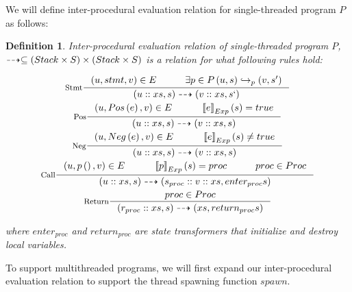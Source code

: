 \documentclass[..thesis.tex]{subfiles}
\newtheorem{defin}{Definition}[section]
\begin{document}
We will define inter-procedural evaluation relation for single-threaded program $P$ as follows:

\begin{defin}

Inter-procedural evaluation relation of single-threaded program $P$, 
$\dashrightarrow \subseteq \left( Stack \times S \right) \times \left( Stack \times S \right)$ 
is a relation for what following rules hold:

\addtolength{\jot}{2em}
\begin{gather*}
  \inference[Stmt]{\lp u, stmt, v \rp \in E  \separ \exists p \in P  \lp u, s \rp \intraproc_p \lp v, s' \rp }{ \lp u :: xs, s \rp \interproc \lp v :: xs, s` \rp} \\
  \inference[Pos]{ \lp u, Pos \lp e \rp, v \rp \in E \separ   \lllb e \rrrb_{Exp} \lp s \rp = true  }{\lp u :: xs , s \rp \interproc \lp v :: xs, s \rp} \\ 
  \inference[Neg]{ \lp u, Neg \lp e \rp, v \rp  \in E \separ   \lllb e \rrrb_{Exp} \lp s \rp \neq true  }{\lp u :: xs , s \rp \interproc \lp v :: xs, s \rp} \\
  \inference[Call]{ \lp u, p\lp\rp , v \rp  \in E \separ  \lllb p \rrrb_{Exp} \lp s \rp = proc \separ proc \in Proc }{\lp u :: xs , s \rp \interproc \lp s_{proc} :: v :: xs, enter_{proc} s \rp} \\
  \inference[Return] { proc \in Proc} { \lp r_{proc}::xs , s \rp \interproc \lp xs, return_{proc} s \rp}
\end{gather*}
\addtolength{\jot}{-2em}

where $enter_{proc}$ and $return_{proc}$ are state transformers that initialize and destroy local variables.
\end{defin}


To support multithreaded programs, we will first expand our inter-procedural evaluation relation to support the thread spawning function $spawn$.
\end{document}
